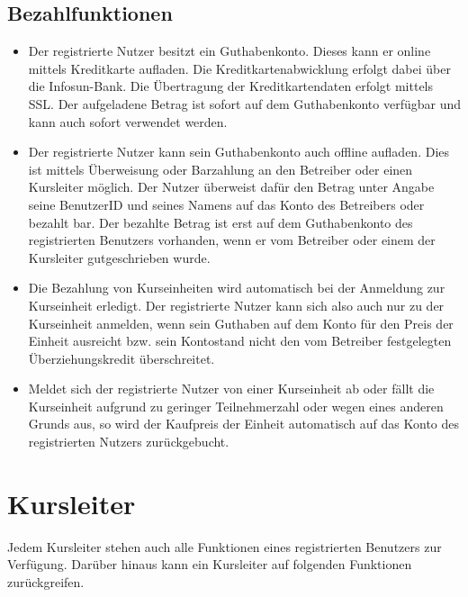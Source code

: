 \documentclass[a4paper]{scrreprt}
\newcounter{Lc}
\newcounter{Hc}
\newcommand{\stepHc}{\stepcounter{Hc}\setcounter{Lc}{0}}
\begin{document}
		\subsection{Bezahlfunktionen}
			\begin{itemize}
				\item {}
					Der registrierte Nutzer besitzt ein Guthabenkonto. Dieses kann er online mittels Kreditkarte aufladen. Die Kreditkartenabwicklung erfolgt dabei
					über die Infosun-Bank. Die Übertragung der Kreditkartendaten erfolgt mittels SSL. Der aufgeladene Betrag ist sofort auf dem Guthabenkonto verfügbar und kann auch sofort verwendet werden.
				\item {}
					Der registrierte Nutzer kann sein Guthabenkonto auch offline aufladen. Dies ist mittels Überweisung oder Barzahlung an den Betreiber oder einen Kursleiter möglich. 
					Der Nutzer überweist dafür den Betrag unter Angabe seine BenutzerID und seines Namens  auf das Konto des Betreibers oder bezahlt bar. Der bezahlte Betrag ist erst auf dem Guthabenkonto des registrierten Benutzers vorhanden, wenn er vom Betreiber oder einem der Kursleiter gutgeschrieben wurde.
				\item {}
					Die Bezahlung von Kurseinheiten wird automatisch bei der Anmeldung zur Kurseinheit erledigt. Der registrierte Nutzer kann sich also auch nur zu der Kurseinheit anmelden, wenn sein Guthaben auf dem Konto für den Preis der Einheit ausreicht bzw. sein Kontostand nicht den vom Betreiber festgelegten Überziehungskredit überschreitet.
				\item {}
					Meldet sich der registrierte Nutzer von einer Kurseinheit ab oder fällt die Kurseinheit aufgrund zu geringer Teilnehmerzahl oder wegen eines anderen Grunds aus, so wird der Kaufpreis der Einheit automatisch auf das Konto des registrierten Nutzers zurückgebucht.
			\end{itemize}	

	\section{Kursleiter}
	Jedem Kursleiter stehen auch alle Funktionen eines registrierten Benutzers zur Verfügung. Darüber hinaus kann ein Kursleiter auf folgenden Funktionen zurückgreifen.
	\stepHc
\end{document}
